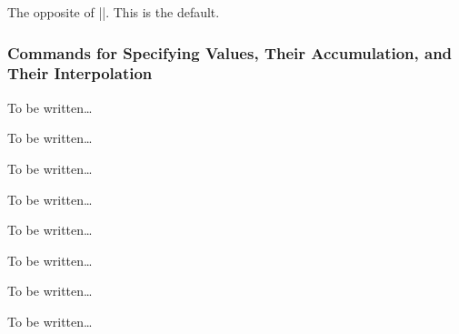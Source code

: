 \begin{command}{\pgfsys@animation@removeatend{}}
  The opposite of |\pgfsys@animation@freezeatend|. This is the default.
\end{command}

\subsubsection{Commands for Specifying Values, Their Accumulation, and
  Their Interpolation}
\label{section-value-types}




\begin{command}{\pgfsys@animation@sum{}}
  To be written\dots
\end{command}

\begin{command}{\pgfsys@animation@replace{}}
  To be written\dots
\end{command}

\begin{command}{\pgfsys@animation@accumulate{}}
  To be written\dots
\end{command}

\begin{command}{\pgfsys@animation@noaccumulate{}}
  To be written\dots
\end{command}




\begin{command}{\pgfsys@animation@discrete{}}
  To be written\dots
\end{command}

\begin{command}{\pgfsys@animation@linear{}}
  To be written\dots
\end{command}

\begin{command}{\pgfsys@animation@paced{}}
  To be written\dots
\end{command}

\begin{command}{\pgfsys@animation@spline{}}
  To be written\dots
\end{command}

